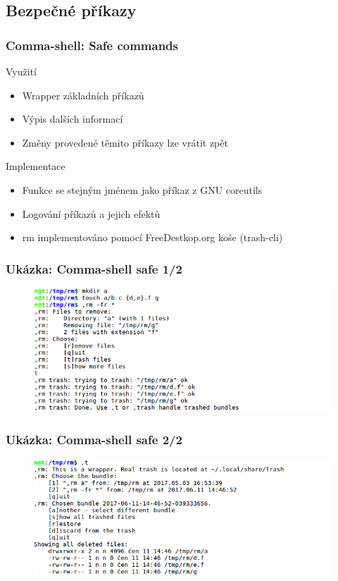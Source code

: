 \documentclass{beamer}
\begin{document}
\subsection{Bezpečné příkazy}
\begin{frame}
	\frametitle{Comma-shell: Safe commands}
	
	\begin{exampleblock}{Využití}
		\begin{itemize}
			\item Wrapper základních příkazů
			\item Výpis dalších informací
			\item Změny provedené těmito příkazy lze vrátit zpět
		\end{itemize}
	\end{exampleblock}		
	
	
	\begin{exampleblock}{Implementace}
		\begin{itemize}
			\item Funkce se stejným jménem jako příkaz z GNU coreutils
			\item Logování příkazů a jejich efektů
			\item rm implementováno pomocí FreeDestkop.org koše (trash-cli)
		\end{itemize}
	\end{exampleblock}		
\end{frame}


\begin{frame}
	\frametitle{Ukázka: Comma-shell safe 1/2}
	\begin{figure}
		\centering
		\includegraphics[width=1.0\textwidth]{./images/2rm1}
	\end{figure}
\end{frame}

\begin{frame}
	\frametitle{Ukázka: Comma-shell safe 2/2}
	\begin{figure}
		\centering
		\includegraphics[width=1.0\textwidth]{./images/2rm2}
	\end{figure}
\end{frame}
\end{document}
